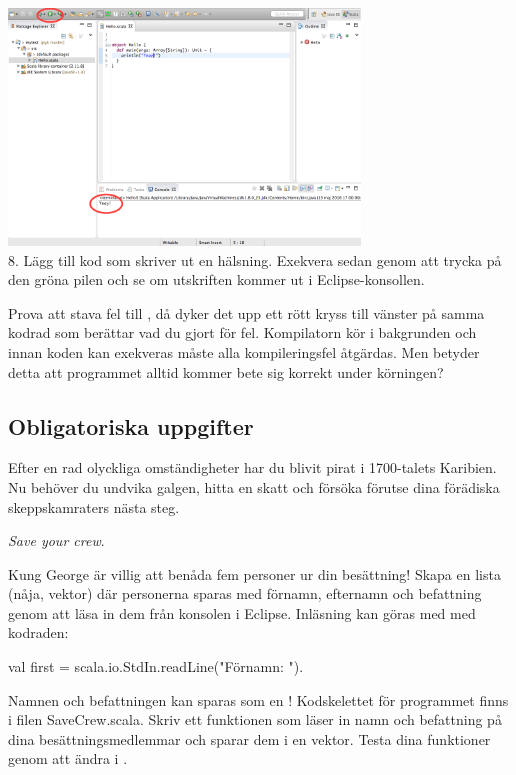 \begin{center}
\vspace{5mm}
\includegraphics[width=0.7\textwidth]{../img/pirates/exekvera.png} \\
8. Lägg till kod som skriver ut en hälsning. Exekvera sedan genom att trycka på den gröna pilen och se om utskriften kommer ut i  Eclipse-konsollen.
\end{center}

Prova att stava fel till , då dyker det upp ett rött kryss till vänster på samma kodrad som berättar vad du gjort för fel. Kompilatorn kör i bakgrunden och innan koden kan exekveras måste alla kompileringsfel åtgärdas. Men betyder detta att programmet alltid kommer bete sig korrekt under körningen?


\subsection{Obligatoriska uppgifter}
Efter en rad olyckliga omständigheter har du blivit pirat i 1700-talets Karibien. Nu beh{\"o}ver du undvika galgen, hitta en skatt och f{\"o}rs{\"o}ka f{\"o}rutse dina f{\"o}r{\"a}diska skeppskamraters n{\"a}sta steg. 

\Task \emph{Save your crew}. 

\Subtask Kung George {\"a}r villig att ben{\aa}da fem personer ur din bes{\"a}ttning! Skapa en lista (nåja, vektor) d{\"a}r personerna sparas med f{\"o}rnamn, efternamn och befattning genom att l{\"a}sa in dem fr{\aa}n konsolen i Eclipse. Inl{\"a}sning kan g{\"o}ras med  med kodraden: 
\begin{Code}
val first = scala.io.StdIn.readLine("Förnamn: "). 
\end{Code}
Namnen och befattningen kan sparas som en ! Kodskelettet för programmet finns i filen SaveCrew.scala. Skriv ett funktionen  som läser in namn och befattning på dina besättningsmedlemmar och sparar dem i en vektor. Testa dina funktioner genom att ändra i .

